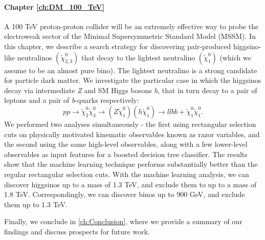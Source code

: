 \paragraph{Chapter \ref{ch:DM_100_TeV}}
A 100 TeV proton-proton collider will be an extremely effective way to probe the electroweak sector of the Minimal Supersymmetric Standard Model (MSSM). In this chapter, we describe a search strategy for discovering pair-produced higgsino-like neutralinos $(\widetilde{\chi}_{2,3}^0)$ that decay to the lightest neutralino $(\widetilde{\chi}_1^0)$ (which we assume to be an almost pure bino). The lightest neutralino is a strong candidate for particle dark matter. We investigate the particular case in which the higgsinos decay via intermediate \emph{Z} and SM Higgs bosons \emph{h}, that in turn decay to a pair of leptons and a pair of \emph{b}-quarks respectively: 
\[pp\rightarrow\widetilde{\chi}^0_2\widetilde{\chi}^0_3\rightarrow (Z\widetilde{\chi}_1^0)(h\widetilde{\chi}_1^0)\rightarrow llbb+\widetilde{\chi}_1^0\widetilde{\chi}_1^0.\]
We performed two analyses simultaneously - the first using rectangular selection cuts on physically motivated kinematic observables known as razor variables, and the second using the same high-level observables, along with a few lower-level observables as input features for a boosted decision tree classifier. The results show that the machine learning technique performs substantially better than the regular rectangular selection cuts. With the machine learning analysis, we can discover higgsinos up to a mass of 1.3 TeV, and exclude them to up to a mass of 1.8 TeV. Correspondingly, we can discover binos up to 900 GeV, and exclude them up to 1.3 TeV.

Finally, we conclude in \autoref{ch:Conclusion}, where we provide a summary of our findings and discuss prospects for future work.

